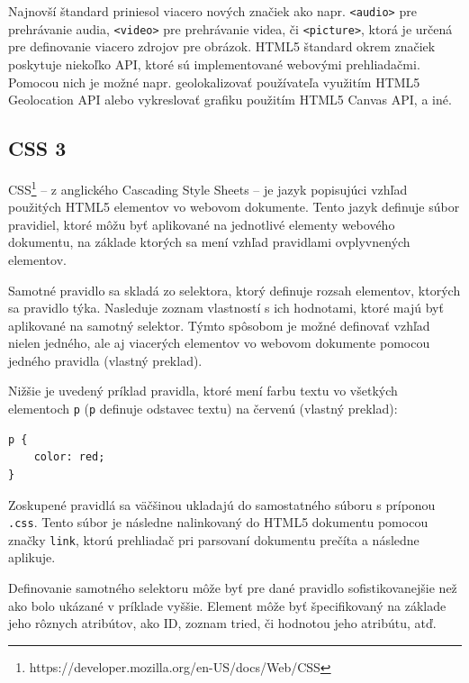 Najnovší štandard priniesol viacero nových značiek ako napr. \texttt{<audio>} pre prehrávanie audia, \texttt{<video>} pre prehrávanie videa, či \texttt{<picture>}, ktorá je určená pre definovanie viacero zdrojov pre obrázok. HTML5 štandard okrem značiek poskytuje niekoľko API, ktoré sú implementované webovými prehliadačmi. Pomocou nich je možné napr. geolokalizovať používateľa využitím HTML5 Geolocation API alebo vykreslovať grafiku použitím HTML5 Canvas API, a iné.

\subsection {CSS 3}
CSS\footnote{https://developer.mozilla.org/en-US/docs/Web/CSS} -- z anglického Cascading Style Sheets -- je jazyk popisujúci vzhľad použitých HTML5 elementov vo webovom dokumente. Tento jazyk definuje súbor pravidiel, ktoré môžu byť aplikované na jednotlivé elementy webového dokumentu, na základe ktorých sa mení vzhľad pravidlami ovplyvnených elementov.

Samotné pravidlo sa skladá zo selektora, ktorý definuje rozsah elementov, ktorých sa pravidlo týka. Nasleduje zoznam vlastností s ich hodnotami, ktoré majú byť aplikované na samotný selektor. Týmto spôsobom je možné definovať vzhľad nielen jedného, ale aj viacerých elementov vo webovom dokumente pomocou jedného pravidla \cite{css_basics} (vlastný preklad).

Nižšie je uvedený príklad pravidla, ktoré mení farbu textu vo všetkých elementoch \texttt{p} (\texttt{p} definuje odstavec textu) na červenú \cite{css_basics} (vlastný preklad):

\begin{minipage}[]{\linewidth}
\begin{verbatim}
p {
    color: red;
}
\end{verbatim}
\end{minipage}

\clearpage

Zoskupené pravidlá sa väčšinou ukladajú do samostatného súboru s príponou \texttt{.css}. Tento súbor je následne nalinkovaný do HTML5 dokumentu pomocou značky \texttt{link}, ktorú prehliadač pri parsovaní dokumentu prečíta a následne aplikuje.

Definovanie samotného selektoru môže byť pre dané pravidlo sofistikovanejšie než ako bolo ukázané v príklade vyššie. Element môže byť špecifikovaný na základe jeho rôznych atribútov, ako ID, zoznam tried, či hodnotou jeho atribútu, atď.

